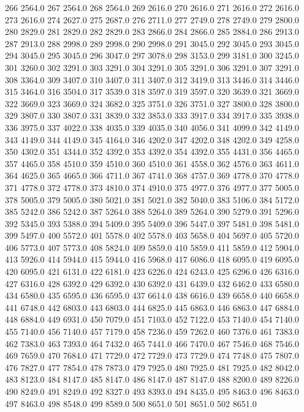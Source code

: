 266 2564.0
267 2564.0
268 2564.0
269 2616.0
270 2616.0
271 2616.0
272 2616.0
273 2616.0
274 2627.0
275 2687.0
276 2711.0
277 2749.0
278 2749.0
279 2800.0
280 2829.0
281 2829.0
282 2829.0
283 2866.0
284 2866.0
285 2884.0
286 2913.0
287 2913.0
288 2998.0
289 2998.0
290 2998.0
291 3045.0
292 3045.0
293 3045.0
294 3045.0
295 3045.0
296 3047.0
297 3078.0
298 3153.0
299 3181.0
300 3245.0
301 3260.0
302 3291.0
303 3291.0
304 3291.0
305 3291.0
306 3291.0
307 3291.0
308 3364.0
309 3407.0
310 3407.0
311 3407.0
312 3419.0
313 3446.0
314 3446.0
315 3464.0
316 3504.0
317 3539.0
318 3597.0
319 3597.0
320 3639.0
321 3669.0
322 3669.0
323 3669.0
324 3682.0
325 3751.0
326 3751.0
327 3800.0
328 3800.0
329 3807.0
330 3807.0
331 3839.0
332 3853.0
333 3917.0
334 3917.0
335 3938.0
336 3975.0
337 4022.0
338 4035.0
339 4035.0
340 4056.0
341 4099.0
342 4149.0
343 4149.0
344 4149.0
345 4164.0
346 4202.0
347 4202.0
348 4202.0
349 4258.0
350 4302.0
351 4344.0
352 4392.0
353 4392.0
354 4392.0
355 4431.0
356 4465.0
357 4465.0
358 4510.0
359 4510.0
360 4510.0
361 4558.0
362 4576.0
363 4611.0
364 4625.0
365 4665.0
366 4711.0
367 4741.0
368 4757.0
369 4778.0
370 4778.0
371 4778.0
372 4778.0
373 4810.0
374 4910.0
375 4977.0
376 4977.0
377 5005.0
378 5005.0
379 5005.0
380 5021.0
381 5021.0
382 5040.0
383 5106.0
384 5172.0
385 5242.0
386 5242.0
387 5264.0
388 5264.0
389 5264.0
390 5279.0
391 5296.0
392 5345.0
393 5388.0
394 5409.0
395 5409.0
396 5447.0
397 5481.0
398 5481.0
399 5497.0
400 5572.0
401 5578.0
402 5578.0
403 5658.0
404 5697.0
405 5720.0
406 5773.0
407 5773.0
408 5824.0
409 5859.0
410 5859.0
411 5859.0
412 5904.0
413 5926.0
414 5944.0
415 5944.0
416 5968.0
417 6086.0
418 6095.0
419 6095.0
420 6095.0
421 6131.0
422 6181.0
423 6226.0
424 6243.0
425 6296.0
426 6316.0
427 6316.0
428 6392.0
429 6392.0
430 6392.0
431 6439.0
432 6462.0
433 6580.0
434 6580.0
435 6595.0
436 6595.0
437 6614.0
438 6616.0
439 6658.0
440 6658.0
441 6748.0
442 6803.0
443 6803.0
444 6825.0
445 6863.0
446 6863.0
447 6884.0
448 6884.0
449 6931.0
450 7079.0
451 7103.0
452 7122.0
453 7140.0
454 7140.0
455 7140.0
456 7140.0
457 7179.0
458 7236.0
459 7262.0
460 7376.0
461 7383.0
462 7383.0
463 7393.0
464 7432.0
465 7441.0
466 7470.0
467 7546.0
468 7546.0
469 7659.0
470 7684.0
471 7729.0
472 7729.0
473 7729.0
474 7748.0
475 7807.0
476 7827.0
477 7854.0
478 7873.0
479 7925.0
480 7925.0
481 7925.0
482 8042.0
483 8123.0
484 8147.0
485 8147.0
486 8147.0
487 8147.0
488 8200.0
489 8226.0
490 8249.0
491 8249.0
492 8327.0
493 8393.0
494 8435.0
495 8463.0
496 8463.0
497 8463.0
498 8548.0
499 8589.0
500 8651.0
501 8651.0
502 8651.0

